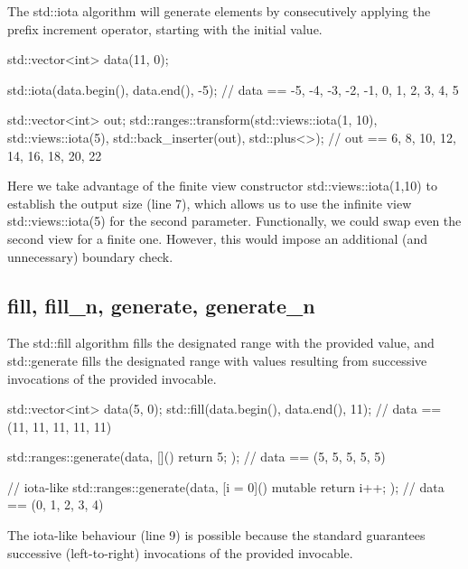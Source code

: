 

The std::iota algorithm will generate elements by consecutively applying the prefix increment operator, starting with the initial value.

\begin{box-note}
\begin{cppcode}
std::vector<int> data(11, 0);

std::iota(data.begin(), data.end(), -5); 
// data == { -5, -4, -3, -2, -1, 0, 1, 2, 3, 4, 5 }

std::vector<int> out;
std::ranges::transform(std::views::iota(1, 10), std::views::iota(5), 
                       std::back_inserter(out), std::plus<>{});
// out == { 6, 8, 10, 12, 14, 16, 18, 20, 22 }
\end{cppcode}
\end{box-note}

Here we take advantage of the finite view constructor std::views::iota(1,10) to establish the output size (line 7), which allows us to use the infinite view std::views::iota(5) for the second parameter. Functionally, we could swap even the second view for a finite one. However, this would impose an additional (and unnecessary) boundary check.

\subsection{fill, fill\_n, generate, generate\_n}



The std::fill algorithm fills the designated range with the provided value, and std::generate fills the designated range with values resulting from successive invocations of the provided invocable.

\begin{box-note}
\begin{cppcode}
std::vector<int> data(5, 0);
std::fill(data.begin(), data.end(), 11);
// data == (11, 11, 11, 11, 11)

std::ranges::generate(data, []() { return 5; });
// data == (5, 5, 5, 5, 5)

// iota-like
std::ranges::generate(data, [i = 0]() mutable { return i++; });
// data == (0, 1, 2, 3, 4)
\end{cppcode}
\end{box-note}

The iota-like behaviour (line 9) is possible because the standard guarantees successive (left-to-right) invocations of the provided invocable.


